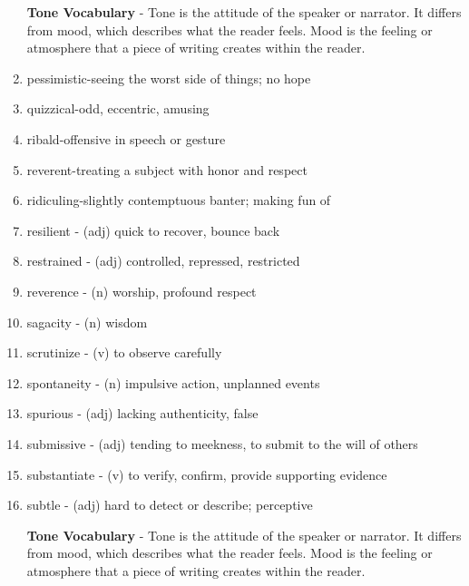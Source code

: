 \begin{enumerate}
\bigskip
\textbf{Tone Vocabulary} - Tone is the attitude of the speaker or narrator.  It differs from mood, which describes what the reader feels.  Mood is the feeling or atmosphere that a piece of writing creates within the reader.  

\bigskip
\item pessimistic-seeing the worst side of things; no hope
\item quizzical-odd, eccentric, amusing
\item ribald-offensive in speech or gesture
\item reverent-treating a subject with honor and respect
\item ridiculing-slightly contemptuous banter; making fun of

\bigskip

\item resilient - (adj) quick to recover, bounce back
\item restrained - (adj) controlled, repressed, restricted
\item reverence - (n) worship, profound respect
\item sagacity - (n) wisdom
\item scrutinize - (v) to observe carefully
\item spontaneity - (n) impulsive action, unplanned events
\item spurious - (adj) lacking authenticity, false
\item submissive -  (adj) tending to meekness, to submit to the will of others
\item substantiate - (v) to verify, confirm, provide supporting evidence
\item subtle - (adj) hard to detect or describe; perceptive

\bigskip
\textbf{Tone Vocabulary} - Tone is the attitude of the speaker or narrator.  It differs from mood, which describes what the reader feels.  Mood is the feeling or atmosphere that a piece of writing creates within the reader.  


\end{enumerate}
